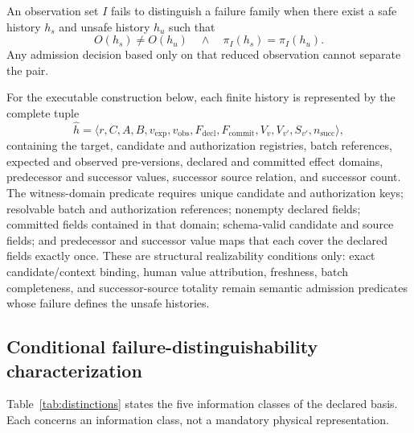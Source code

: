 An observation set $I$ fails to distinguish a failure family when there exist a safe history $h_s$ and unsafe history $h_u$ such that
\begin{equation}
O(h_s)\neq O(h_u)
\quad\land\quad
\pi_I(h_s)=\pi_I(h_u).
\label{eq:indistinguishable}
\end{equation}
Any admission decision based only on that reduced observation cannot separate the pair.

For the executable construction below, each finite history is represented by the complete tuple
\begin{equation}
\widehat h=\langle r,C,A,B,v_{\mathrm{exp}},v_{\mathrm{obs}},
F_{\mathrm{decl}},F_{\mathrm{commit}},V_v,V_{v'},S_{v'},n_{\mathrm{succ}}\rangle,
\label{eq:witness-history}
\end{equation}
containing the target, candidate and authorization registries, batch references, expected and observed pre-versions, declared and committed effect domains, predecessor and successor values, successor source relation, and successor count. The witness-domain predicate requires unique candidate and authorization keys; resolvable batch and authorization references; nonempty declared fields; committed fields contained in that domain; schema-valid candidate and source fields; and predecessor and successor value maps that each cover the declared fields exactly once. These are structural realizability conditions only: exact candidate/context binding, human value attribution, freshness, batch completeness, and successor-source totality remain semantic admission predicates whose failure defines the unsafe histories.

\subsection{Conditional failure-distinguishability characterization}

Table~\ref{tab:distinctions} states the five information classes of the declared basis. Each concerns an information class, not a mandatory physical representation.

